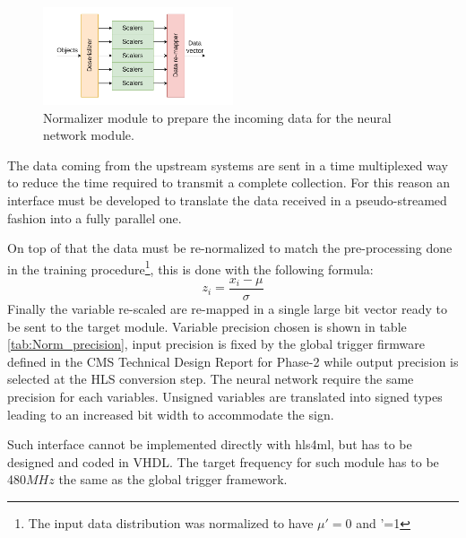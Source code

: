 \documentclass[../../main.tex]{subfiles}
\begin{document}
\begin{figure}
    \centering
    \includegraphics[width=0.5\textwidth]{sections/05/Images/NN_Normalizer.pdf}
    \caption{Normalizer module to prepare the incoming data for the neural network module.}
    \label{fig:NN_norm}
    \vspace{1cm}
\end{figure}
The data coming from the upstream systems are sent in a time multiplexed way to reduce the time required to transmit a complete collection. For this reason an interface must be developed to translate the data received in a pseudo-streamed fashion into a fully parallel one. 

On top of that the data must be re-normalized to match the pre-processing done in the training procedure\footnote{The input data distribution was normalized to have $\mu'=0$ and \sigma'=1}, this is done with the following formula:
\begin{equation}
    z_i=\frac{x_i - \mu}{\sigma}
\end{equation}
Finally the variable re-scaled are re-mapped in a single large bit vector ready to be sent to the target module. Variable precision chosen is shown in table \ref{tab:Norm_precision}, input precision is fixed by the global trigger firmware defined in the CMS Technical Design Report for Phase-2\cite{TDR-2up} while output precision is selected at the HLS conversion step. The neural network require the same precision for each variables. Unsigned variables are translated into signed types leading to an increased bit width to accommodate the sign.  

Such interface cannot be implemented directly with hls4ml, but has to be designed and coded in VHDL. The target frequency for such module has to be 480$MHz$ the same as the global trigger framework.  
\end{document}
